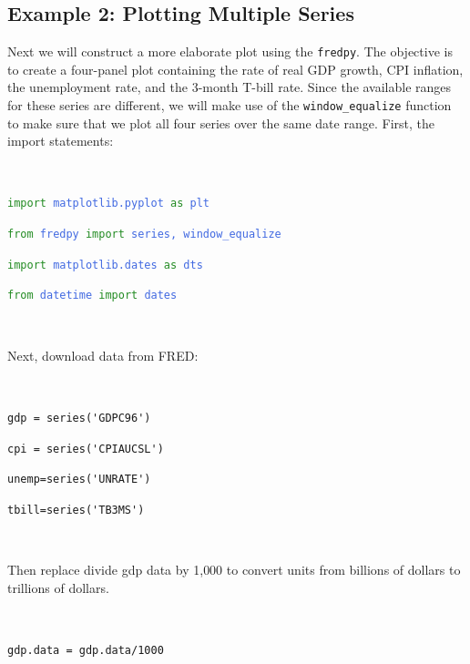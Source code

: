 \documentclass[11pt,fleqn]{article}
\newcommand{\ttt}{\texttt}
\newcommand{\tc}{\textcolor}
\begin{document}
\subsection{Example 2: Plotting Multiple Series}

Next we will construct a more elaborate plot using the \ttt{fredpy}. The objective is to create a four-panel plot containing the rate of real GDP growth, CPI inflation, the unemployment rate, and the 3-month T-bill rate. Since the available ranges for these series are different, we will make use of the \verb!window_equalize! function to make sure that we plot all four series over the same date range. First, the import statements:

\

\begin{minipage}{6.5in}
\ttt{\tc{ForestGreen}{import} \tc{RoyalBlue}{matplotlib.pyplot} \tc{ForestGreen}{as} \tc{RoyalBlue}{plt}}

\ttt{\tc{ForestGreen}{from} \tc{RoyalBlue}{fredpy} \tc{ForestGreen}{import} \tc{RoyalBlue}{series, window\_equalize}}

\ttt{\tc{ForestGreen}{import} \tc{RoyalBlue}{matplotlib.dates} \tc{ForestGreen}{as} \tc{RoyalBlue}{dts}}

\ttt{\tc{ForestGreen}{from} \tc{RoyalBlue}{datetime} \tc{ForestGreen}{import} \tc{RoyalBlue}{dates}}

\

\end{minipage}

\noindent Next, download data from FRED:

\

\begin{minipage}{6.5in}
\verb!gdp = series('GDPC96')!

\verb!cpi = series('CPIAUCSL')!

\verb!unemp=series('UNRATE')!

\verb!tbill=series('TB3MS')!

\

\end{minipage}

\noindent Then replace divide gdp data by 1{,}000 to convert units from billions of dollars to trillions of dollars.

\

\begin{minipage}{6.5in}

\ttt{gdp.data = gdp.data/1000}

\

\end{minipage}
\end{document}
